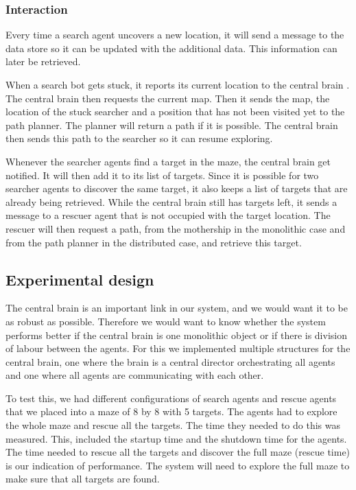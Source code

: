 \subsubsection{Interaction}
Every time a search agent uncovers a new location, it will send a message to
the data store so it can be updated with the additional data. This information
can later be retrieved.

When a search bot gets stuck, it reports its current location to the central
brain . The central brain then requests the current map. Then it sends the
map, the location of the stuck searcher and a position that has not been
visited yet to the path planner. The planner will return a path if it is
possible. The central brain then sends this path to the searcher so it can
resume exploring.

Whenever the searcher agents find a target in the maze, the central brain
get notified. It will then add it to its list of targets. Since it is
possible for two searcher agents to discover the same target, it also keeps
a list of targets that are already being retrieved. While the central brain
still has targets left, it sends a message to a rescuer agent that is not
occupied with the target location. The rescuer will then request a path,
from the mothership in the monolithic case and from the path planner in the
distributed case, and retrieve this target.

\subsection{Experimental design}
The central brain is an important link in our system, and we would want it to
be as robust as possible. Therefore we would want to know whether the
system performs better if the central brain is one monolithic object or if
there is division of labour between the agents. For this we implemented
multiple structures for the central brain, one where the brain is a central
director orchestrating all agents and one where all agents are
communicating with each other. 

To test this, we had different configurations of search agents and rescue
agents that we placed into a maze of 8 by 8 with 5 targets. The agents had
to explore the whole maze and rescue all the targets. The time they needed
to do this was measured. This, included the startup time and the shutdown
time for the agents. The time needed to rescue all the targets and discover
the full maze (rescue time) is our indication of performance. The system
will need to explore the full maze to make sure that all targets are found.

